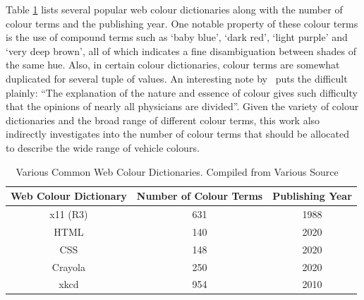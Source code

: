 Table \ref{table:allcolourterms} lists several popular web colour dictionaries
along with the number of colour terms and the publishing year. One
notable property of these colour terms is the use of compound terms such as
`baby blue', `dark red', `light purple' and `very deep brown', all of which indicates a fine disambiguation between shades of the same hue.
Also, in certain colour dictionaries, colour terms are somewhat duplicated for several tuple of values. An interesting note by~ puts the difficult plainly: ``The explanation of the nature and essence of colour gives such difficulty that the opinions of nearly all physicians are divided''. Given the variety of colour dictionaries and the broad range of different colour terms, this work also indirectly investigates into the number of colour terms that should be allocated to describe the wide range of vehicle colours.

\begin{table}[hbt!]
 \caption[Web Colour Dictionary and the Corresponding Number of Colour Terms]
 {Various Common Web Colour Dictionaries. Compiled from Various Source ~\cite{jaffer_2017, raveling, crayolacolor} %
 }
 \centering
 \begin{tabular}{|c|c|c|} \hline
 \multicolumn{1}{|c|}{\textbf{Web Colour Dictionary}} &
 \multicolumn{1}{c|}{\textbf{Number of Colour Terms}} &
 \multicolumn{1}{c|}{\textbf{Publishing Year}} \\ \hline x11 (R3)
 & 631                         & 1988
 \\ \hline HTML                        & 140
 & 2020              \\ \hline CSS
 & 148                         & 2020
 \\ \hline Crayola                       & 250
 & 2020              \\ \hline xkcd
 & 954                         & 2010
 \\ \hline
 \end{tabular}
\label{table:allcolourterms}
\end{table}

